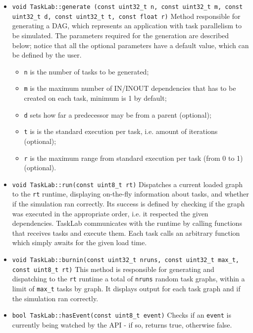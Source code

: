 \begin{itemize}
\item \texttt{\noindent void TaskLab::generate \newline
(const uint32\_t n, const uint32\_t m, const uint32\_t d, \newline
 const uint32\_t t, const float r)} \newline
Method responsible for generating a DAG, which represents an application with task parallelism to be simulated. The parameters required for the generation are described below; notice that all the optional parameters have a default value, which can be defined by the user.
\begin{itemize}
\item \texttt{n} is the number of tasks to be generated; 
\item \texttt{m} is the maximum number of IN/INOUT dependencies that has to be created on each task, minimum is 1 by default; 
\item \texttt{d} sets how far a predecessor may be from a parent (optional); 
\item \texttt{t} is is the standard execution per task, i.e. amount of iterations (optional); 
\item \texttt{r} is the maximum range from standard execution per task (from 0 to 1) (optional). 
\end{itemize}

\item \texttt{void TaskLab::run(const uint8\_t rt)} \newline
Dispatches a current loaded graph to the \texttt{rt} runtime, displaying on-the-fly information about tasks, and whether if the simulation ran correctly. Its success is defined by checking if the graph was executed in the appropriate order, i.e. it respected the given dependencies. TaskLab communicates with the runtime by calling functions that receives tasks and execute them. Each task calls an arbitrary function which simply awaits for the given load time.

\item \texttt{void TaskLab::burnin(const uint32\_t nruns, const uint32\_t max\_t, const uint8\_t rt)} \newline
This method is responsible for generating and dispatching to the \texttt{rt} runtime a total of \texttt{nruns} random task graphs, within a limit of \texttt{max\_t} tasks by graph. It displays output for each task graph and if the simulation ran correctly.

\item\texttt{bool TaskLab::hasEvent(const uint8\_t event)} \newline
Checks if an \texttt{event} is currently being watched by the API - if so, returns true, otherwise false.


\end{itemize}
